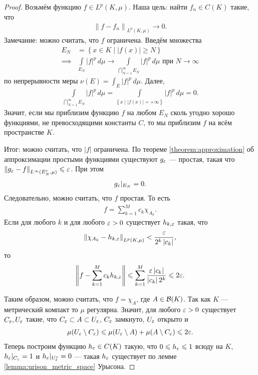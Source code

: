 \begin{proof}
 Возьмём функцию $f \in L^{p}(K,\mu)$. Наша цель: найти $f_n \in C(K)$ такие, что \begin{align*}
  \left\| f - f_n \right\|_{L^{p}(K,\mu)} \to 0
 .\end{align*} Замечание: можно считать, что $f$ ограничена. Введём множества  \begin{align*}
 E_N &= \left\{ x \in K \mid \left| f(x) \right| \geqslant N \right\} \\
 \implies & \int\limits_{E_N} \left| f \right|^{p} \, d\mu   \to \int\limits_{\bigcap_{N=1}^{\infty} E_N} \left| f \right|^{p} \, d\mu \text{ при } N \to \infty
 \end{align*} по непрерывности меры $\nu(E) = \int_{E} \left| f \right|^{p} \, d\mu $. Далее,
 \begin{align*}
  \int\limits_{\bigcap_{N=1}^{\infty} E_N} \left| f \right|^{p} \, d\mu = \int\limits_{\left\{ x \mid \left| f(x) \right| = +\infty \right\}} \left| f \right|^{p} \, d\mu    = 0
 .\end{align*} Значит, если мы приблизим функцию $f$ на любом $E_N$ сколь угодно хорошо функциями, не превосходящими константы $C$, то мы приблизим $f$ на всём пространстве $K$.

 Итог: можно считать, что $\left| f \right|$ ограничена. По теореме \ref{theorem:approximation} об аппроксимации простыми функциями существуют $g_{\varepsilon}$ --- простая, такая что $\left\| g_{\varepsilon} - f \right\|_{L^{\infty}(E^{c}_N, \mu)} \leqslant \varepsilon$. При этом \begin{align*}
  g_{\varepsilon} \rvert_{E_N} = 0
 .\end{align*} Следовательно, можно считать, что $f$ простая. То есть \begin{align*}
 f = \sum_{k=1}^{M}  c_k \chi_{A_k}
.\end{align*} Если для любого $k$ и для любого $\varepsilon > 0$ существует $h_{k,\varepsilon}$ такая, что  \begin{align*}
\left\| \chi_{A_k} - h_{k,\varepsilon} \right\|_{L^{p}(K,\mu)} < \frac{\varepsilon}{2^{k}\left| c_k \right|}
,\end{align*} то \begin{align*}
\left\| f - \sum_{k=1}^{M} c_k h_{k,\varepsilon} \right\| \leqslant \sum_{k=1}^{M}  \frac{\varepsilon \left| c_k \right|}{\left| c_k \right| 2^{k}} \leqslant 2\varepsilon
.\end{align*}

Таким образом, можно считать, что $f = \chi_A$, где $A \in \mathcal{B}(K)$. Так как $K$ --- метрический компакт то $\mu$ регулярна. Значит, для любого $\varepsilon > 0$ существует $C_{\varepsilon}, U_{\varepsilon}$ такие, что $C_{\varepsilon} \subset A \subset U_{\varepsilon}$, $C_{\varepsilon}$ замкнуто, $U_{\varepsilon}$ открыто и 
\begin{align*}
\mu(U_{\varepsilon} \setminus C_{\varepsilon}) \leqslant \mu(U_{\varepsilon} \setminus A) + \mu(A \setminus C_{\varepsilon}) \leqslant 2\varepsilon
.\end{align*} Теперь построим функцию $h_{\varepsilon} \in C(K)$ такую, что $0 \leqslant h_{\varepsilon} \leqslant 1$ всюду на $K$, $h_{\varepsilon} \rvert_{C_{\varepsilon}} = 1$ и $h_{\varepsilon} \rvert_{U^{c}_{\varepsilon}} = 0$ --- такая $h_{\varepsilon}$ существует по лемме \ref{lemma:urison_metric_space} Урысона.


\end{proof}
